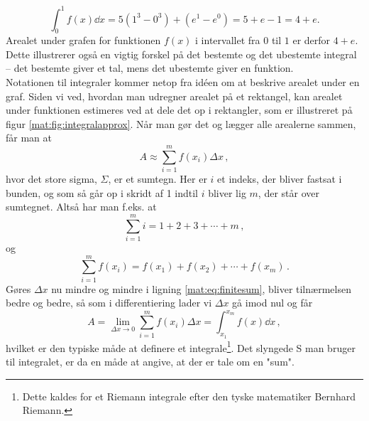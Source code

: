 \begin{equation*}
    \int_0^1 f(x) \dd{x} = 5 \left( 1^3 - 0^3 \right) + \left( e^1 - e^0 \right) = 5 + e - 1 = 4 + e.
\end{equation*}
Arealet under grafen for funktionen $f(x)$ i intervallet fra $0$ til $1$ er derfor $4+e$. Dette illustrerer også en vigtig forskel på det bestemte og det ubestemte integral -- det bestemte giver et tal, mens det ubestemte giver en funktion.\\

Notationen til integraler kommer netop fra idéen om at beskrive arealet under en graf.
Siden vi ved, hvordan man udregner arealet på et rektangel, kan arealet under funktionen estimeres ved at dele det op i rektangler, som er illustreret på figur \ref{mat:fig:integralapprox}.
Når man gør det og lægger alle arealerne sammen, får man at
\begin{equation} \label{mat:eq:finitesum}
    A\approx \sum_{i=1}^mf(x_i)\Delta x \, ,
\end{equation}
hvor det store sigma, $\Sigma$, er et sumtegn. Her er $i$ et indeks, der bliver fastsat i bunden, og som så går op i skridt af 1 indtil $i$ bliver lig $m$, der står over sumtegnet. Altså har man f.eks. at
\begin{equation}
\sum_{i=1}^m i = 1+2+3+\cdots+m \,  ,    
\end{equation}
og
\begin{equation}
\sum_{i=1}^m f(x_i) = f(x_1)+f(x_2)+\cdots+f(x_m) \, .
\end{equation}
Gøres $\Delta x$ nu mindre og mindre i ligning \eqref{mat:eq:finitesum}, bliver tilnærmelsen bedre og bedre, så som i differentiering lader vi $\Delta x$ gå imod nul og får
\begin{equation}
    A=\lim_{\Delta x\rightarrow 0}\sum_{i=1}^m f(x_i)\Delta x=\int_{x_1}^{x_m}f(x)\dd{x} \, ,
\end{equation}
hvilket er den typiske måde at definere et integrale\footnote{Dette kaldes for et Riemann integrale efter den tyske matematiker Bernhard Riemann.}. Det slyngede S man bruger til integralet, er da en måde at angive, at der er tale om en "sum".

